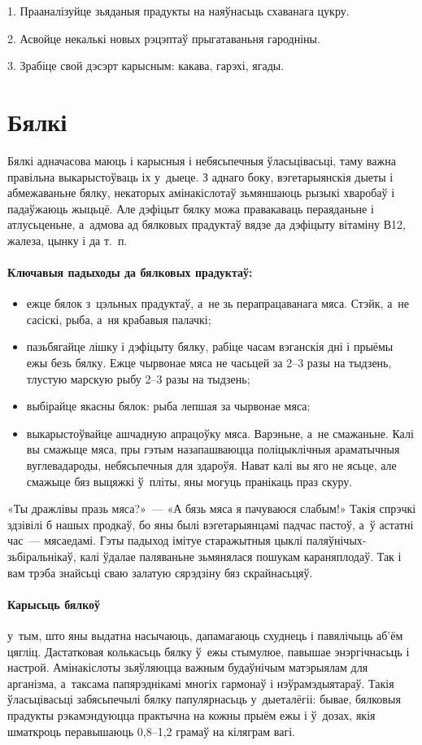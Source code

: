 1. Прааналізуйце зьяданыя прадукты на наяўнасьць схаванага цукру.

2. Асвойце некалькі новых рэцэптаў прыгатаваньня гародніны.

3. Зрабіце свой дэсэрт карысным: какава, гарэхі, ягады.


\section{Бялкі}

Бялкі адначасова маюць і карысныя і небясьпечныя ўласьцівасьці, таму важна правільна выкарыстоўваць іх у~дыеце. З аднаго боку, вэгетарыянскія дыеты і абмежаваньне бялку, некаторых амінакіслотаў зьмяншаюць рызыкі хваробаў і падаўжаюць жыцьцё. Але дэфіцыт бялку можа правакаваць пераяданьне і атлусьценьне, а~адмова ад бялковых прадуктаў вядзе да дэфіцыту вітаміну В12, жалеза, цынку і да т.~п.

\paragraph{Ключавыя падыходы да бялковых прадуктаў:}
\begin{itemize}
  \item ежце бялок з~цэльных прадуктаў, а~не зь перапрацаванага мяса. Стэйк, а~не сасіскі, рыба, а~ня крабавыя палачкі;
  \item пазьбягайце лішку і дэфіцыту бялку, рабіце часам вэганскія дні і прыёмы ежы безь бялку. Ежце чырвонае мяса не часьцей за 2--3 разы на тыдзень, тлустую марскую рыбу 2--3 разы на тыдзень;
  \item выбірайце якасны бялок: рыба лепшая за чырвонае мяса;
  \item выкарыстоўвайце ашчадную апрацоўку мяса. Варэньне, а~не смажаньне. Калі вы смажыце мяса, пры гэтым назапашваюцца поліцыклічныя араматычныя вуглевадароды, небясьпечныя для здароўя. Нават калі вы яго не ясьце, але смажыце бяз выцяжкі ў~пліты, яны могуць пранікаць праз скуру.
\end{itemize}

«Ты дражлівы празь мяса?»~--- «А бязь мяса я пачуваюся слабым!» Такія спрэчкі здзівілі б нашых продкаў, бо яны былі вэгетарыянцамі падчас пастоў, а~ў астатні час~--- мясаедамі. Гэты падыход імітуе старажытныя цыклі паляўнічых-зьбіральнікаў, калі ўдалае паляваньне зьмянялася пошукам караняплодаў. Так і вам трэба знайсьці сваю залатую сярэдзіну бяз скрайнасьцяў.

\paragraph{Карысьць бялкоў} у~тым, што яны выдатна насычаюць, дапамагаюць схуднець і павялічыць аб'ём цягліц. Дастатковая колькасьць бялку ў~ежы стымулюе, павышае энэргічнасьць і настрой. Амінакіслоты зьяўляюцца важным будаўнічым матэрыялам для арганізма, а~таксама папярэднікамі многіх гармонаў і нэўрамэдыятараў. Такія ўласьцівасьці забясьпечылі бялку папулярнасьць у~дыеталёгіі: бывае, бялковыя прадукты рэкамэндуюцца практычна на кожны прыём ежы і ў~дозах, якія шматкроць перавышаюць 0,8--1,2 грамаў на кіляграм вагі. 

